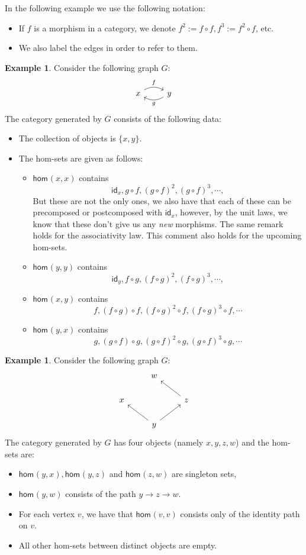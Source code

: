 \documentclass[a4paper,11pt, oneside,titlepage=false]{scrbook}
\theoremstyle{plain}
\theoremstyle{definition}
\newtheorem{exa}[thm]{Example}
\newcommand{\cfont}[1]{\ensuremath{\mathsf{#1}}}
\newcommand{\Hom}[3][]{\cfont{hom}_{#1}(#2,#3)}
\newcommand{\Id}[1][]{\cfont{id}_{#1}}
\newcommand{\co}[2]{\ensuremath{#2 \circ #1}}
\begin{document}
In the following example we use the following notation:
\begin{itemize}
\item If $f$ is a morphism in a category, we denote $f^{2} := \co{f}{f}, f^{3} := \co{f}{f^2}$, etc.
\item We also label the edges in order to refer to them.
\end{itemize}
\begin{exa}\label{exa:graph_xy_yx} Consider the following graph $G$:
\[
\begin{tikzcd}
x \arrow[r, "f", bend left] & y \arrow[l, "g", bend left]
\end{tikzcd}
\]
The category generated by $G$ consists of the following data:
\begin{itemize}
\item The collection of objects is $\{x,y\}$.
\item The hom-sets are given as follows:
\begin{itemize}
\item $\Hom{x}{x}$ contains
\[
\Id[x], \co{f}{g}, (\co{f}{g})^2, (\co{f}{g})^3, \cdots,
\]
But these are not the only ones, we also have that each of these can be precomposed or postcomposed with $\Id[x]$, however, by the unit laws, we know that these don't give us any \textit{new} morphisms. The same remark holds for the associativity law. This comment also holds for the upcoming hom-sets.
\item $\Hom{y}{y}$ contains
\[
\Id[y], \co{g}{f}, (\co{g}{f})^2, (\co{g}{f})^3, \cdots,
\]
\item $\Hom{x}{y}$ contains
\[
f, \co{f}{(\co{g}{f})}, \co{f}{(\co{g}{f})^2}, \co{f}{(\co{g}{f})^3}, \cdots
\]
\item $\Hom{y}{x}$ contains
\[
g, \co{g}{(\co{f}{g})}, \co{g}{(\co{f}{g})^2}, \co{g}{(\co{f}{g})^3}, \cdots
\]
\end{itemize}
\end{itemize}
\end{exa}

\begin{exa}\label{exa:graph_yx_yz_zw} Consider the following graph $G$:
\[
\begin{tikzcd}
& w & \\
x & & z \arrow[lu] \\
& y \arrow[lu] \arrow[ru] &
\end{tikzcd}
\]
The category generated by $G$ has four objects (namely $x,y,z,w$) and the hom-sets are:
\begin{itemize}
\item $\Hom{y}{x}, \Hom{y}{z}$ and $\Hom{z}{w}$ are singleton sets,
\item $\Hom{y}{w}$ consists of the path $y\to z\to w$.
\item For each vertex $v$, we have that $\Hom{v}{v}$ consists only of the identity path on $v$.
\item All other hom-sets between distinct objects are empty.
\end{itemize}
\end{exa}
\end{document}
